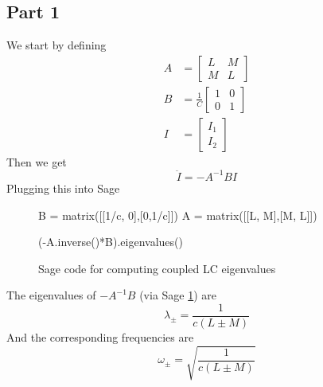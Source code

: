 \subsection{Part 1}
We start by defining
\begin{equation}
    \begin{split}
        A &= \begin{bmatrix}
            L & M \\
            M & L
        \end{bmatrix}\\
        B & = \frac{1}{C}\begin{bmatrix}
            1 & 0\\
            0 & 1
        \end{bmatrix}\\
        I & = \begin{bmatrix}
            I_1\\
            I_2
        \end{bmatrix}
    \end{split}
\end{equation}
Then we get
\begin{equation}
    \ddot{I} = -A^{-1}BI
\end{equation}
Plugging this into Sage
\begin{figure}
    \centering
    \begin{python}
B = matrix([[1/c, 0],[0,1/c]])
A = matrix([[L, M],[M, L]])

(-A.inverse()*B).eigenvalues()
\end{python}
    \caption{Sage code for computing coupled LC eigenvalues}
    \label{fig:LCeigen}
\end{figure}
The eigenvalues of $-A^{-1}B$ (via Sage \ref{fig:LCeigen}) are
\begin{equation}
    \lambda_\pm = \frac{1}{c(L\pm M)}
\end{equation}
And the corresponding frequencies are
\begin{equation}
    \omega_\pm = \sqrt{\frac{1}{c(L\pm M)}}
\end{equation}

\pagebreak

